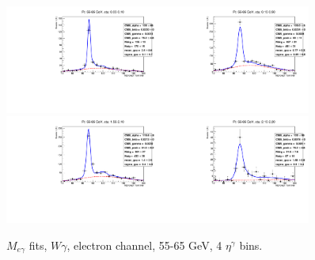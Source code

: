 \begin{figure}[htb]
  \begin{center}
   \includegraphics[width=0.45\textwidth]{../figs/figs_v11/ELECTRON_WGamma/EtoGammaFits/sa_hZmass_h_Data_EtoGamma_Enr_BARREL_pt55to65_ieta0.pdf}\includegraphics[width=0.45\textwidth]{../figs/figs_v11/ELECTRON_WGamma/EtoGammaFits/sa_hZmass_h_Data_EtoGamma_Enr_BARREL_pt55to65_ieta1.pdf}\\
   \includegraphics[width=0.45\textwidth]{../figs/figs_v11/ELECTRON_WGamma/EtoGammaFits/sa_hZmass_h_Data_EtoGamma_Enr_ENDCAP_pt55to65_ieta0.pdf}\includegraphics[width=0.45\textwidth]{../figs/figs_v11/ELECTRON_WGamma/EtoGammaFits/sa_hZmass_h_Data_EtoGamma_Enr_ENDCAP_pt55to65_ieta1.pdf}\\
  \label{fig:etogFits_55to65}
  \caption{$M_{e\gamma}$ fits, $W\gamma$, electron channel, 55-65 GeV, 4 $\eta^{\gamma}$ bins.}
  \end{center}
\end{figure}

